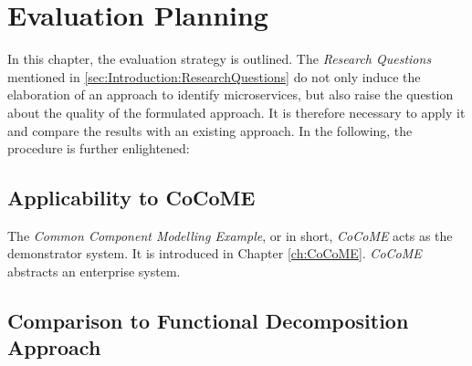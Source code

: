\chapter{Evaluation Planning}
\label{ch:EvalutationPlanning}
In this chapter, the evaluation strategy is outlined. The \textit{Research Questions} mentioned in \ref{sec:Introduction:ResearchQuestions} do not only induce the elaboration of an approach to identify microservices, but also raise the question about the quality of the formulated approach. It is therefore necessary to apply it and compare the results with an existing approach. In the following, the procedure is further enlightened:

\section{Applicability to CoCoME}
\label{sec:EvaluationPlanning:ApplicabilityToCoCoME}
The \textit{Common Component Modelling Example}, or in short, \textit{CoCoME} acts as the demonstrator system. It is  introduced in Chapter \ref{ch:CoCoME}. \textit{CoCoME} abstracts an enterprise system.

\section{Comparison to Functional Decomposition Approach}